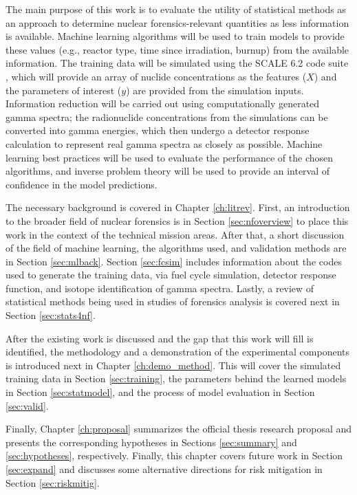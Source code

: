 The main purpose of this work is to evaluate the utility of statistical methods
as an approach to determine nuclear forensics-relevant quantities as less
information is available. Machine learning algorithms will be used to train
models to provide these values (e.g., reactor type, time since irradiation,
burnup) from the available information. The training data will be simulated
using the SCALE 6.2 code suite \cite{scale}, which will provide an array of
nuclide concentrations as the features ($X$) and the parameters of interest
($y$) are provided from the simulation inputs.  Information reduction will be
carried out using computationally generated gamma spectra; the radionuclide
concentrations from the simulations can be converted into gamma energies, which
then undergo a detector response calculation to represent real gamma spectra as
closely as possible. Machine learning best practices will be used to evaluate
the performance of the chosen algorithms, and inverse problem theory will be
used to provide an interval of confidence in the model predictions.

The necessary background is covered in Chapter \ref{ch:litrev}.  First, an
introduction to the broader field of nuclear forensics is in Section
\ref{sec:nfoverview} to place this work in the context of the technical mission
areas. After that, a short discussion of the field of machine learning, the
algorithms used, and validation methods are in Section \ref{sec:mlback}.
Section \ref{sec:fcsim} includes information about the codes used to generate
the training data, via fuel cycle simulation, detector response function, and
isotope identification of gamma spectra.  Lastly, a review of statistical
methods being used in studies of forensics analysis is covered next in Section
\ref{sec:stats4nf}. 

After the existing work is discussed and the gap that this work will fill is
identified, the methodology and a demonstration of the experimental components
is introduced next in Chapter \ref{ch:demo_method}. This will cover the
simulated training data in Section \ref{sec:training}, the parameters behind
the learned models in Section \ref{sec:statmodel}, and the process of model
evaluation in Section \ref{sec:valid}.  

Finally, Chapter \ref{ch:proposal} summarizes the official thesis research
proposal and presents the corresponding hypotheses in Sections
\ref{sec:summary} and \ref{sec:hypotheses}, respectively. Finally, this chapter
covers future work in Section \ref{sec:expand} and discusses some alternative
directions for risk mitigation in Section \ref{sec:riskmitig}.
